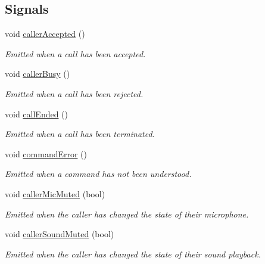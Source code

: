 \subsection*{\-Signals}
\begin{DoxyCompactItemize}
\item 
\hypertarget{class_command_client_a51e78fcbc30e280148c3d96febd3f2f5}{
void \hyperlink{class_command_client_a51e78fcbc30e280148c3d96febd3f2f5}{caller\-Accepted} ()}
\label{class_command_client_a51e78fcbc30e280148c3d96febd3f2f5}

\begin{DoxyCompactList}\small\item\em \-Emitted when a call has been accepted. \end{DoxyCompactList}\item 
\hypertarget{class_command_client_ad0881250571d8d7ec7162f7ec5aca387}{
void \hyperlink{class_command_client_ad0881250571d8d7ec7162f7ec5aca387}{caller\-Busy} ()}
\label{class_command_client_ad0881250571d8d7ec7162f7ec5aca387}

\begin{DoxyCompactList}\small\item\em \-Emitted when a call has been rejected. \end{DoxyCompactList}\item 
\hypertarget{class_command_client_a191f0dce261b1edc31709f919882606b}{
void \hyperlink{class_command_client_a191f0dce261b1edc31709f919882606b}{call\-Ended} ()}
\label{class_command_client_a191f0dce261b1edc31709f919882606b}

\begin{DoxyCompactList}\small\item\em \-Emitted when a call has been terminated. \end{DoxyCompactList}\item 
void \hyperlink{class_command_client_a72548d402f5213d7e49f7292a47b5194}{command\-Error} ()
\begin{DoxyCompactList}\small\item\em \-Emitted when a command has not been understood. \end{DoxyCompactList}\item 
void \hyperlink{class_command_client_a52ec0fcb2b894c2e3642779d27c4bb14}{caller\-Mic\-Muted} (bool)
\begin{DoxyCompactList}\small\item\em \-Emitted when the caller has changed the state of their microphone. \end{DoxyCompactList}\item 
void \hyperlink{class_command_client_a71bad5cfe2219924e6aaec0f2426b03d}{caller\-Sound\-Muted} (bool)
\begin{DoxyCompactList}\small\item\em \-Emitted when the caller has changed the state of their sound playback. \end{DoxyCompactList}\end{DoxyCompactItemize}
